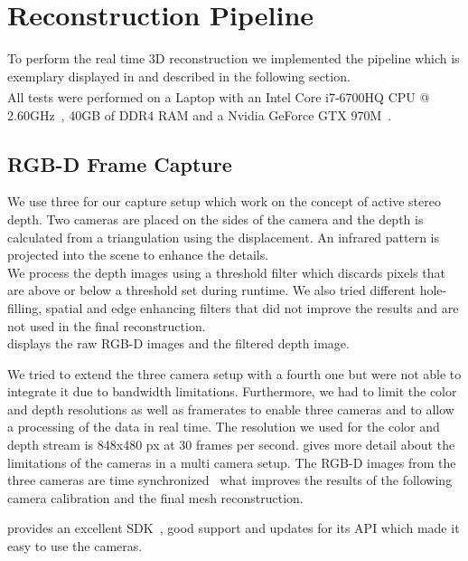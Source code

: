 \documentclass[10pt,twocolumn,letterpaper]{article}
\begin{document}
\section{Reconstruction Pipeline}
To perform the real time 3D reconstruction we implemented the pipeline which is exemplary displayed in  and described in the following section.\\
All tests were performed on a Laptop with an Intel\textsuperscript{\textregistered} Core\texttrademark{} \mbox{i7-6700HQ} CPU @ 2.60GHz~\cite{CPU}, 40GB of DDR4 RAM and a Nvidia GeForce GTX 970M~\cite{GTX970}.

\subsection{RGB-D Frame Capture}
We use three \rscamera{} for our capture setup which work on the concept of active stereo depth. Two cameras are placed on the sides of the camera and the depth is calculated from a triangulation using the displacement. An infrared pattern is projected into the scene to enhance the details.\\
We process the depth images using a threshold filter which discards pixels that are above or below a threshold set during runtime. We also tried different hole-filling, spatial and edge enhancing filters that did not improve the results and are not used in the final reconstruction.\\
 displays the raw RGB-D images and the filtered depth image.

We tried to extend the three camera setup with a fourth one but were not able to integrate it due to bandwidth limitations. Furthermore, we had to limit the color and depth resolutions as well as framerates to enable three cameras and to allow a processing of the data in real time. The resolution we used for the color and depth stream is 848x480 px at 30 frames per second. \cite{RealSenseWhitepaper} gives more detail about the limitations of the cameras in a multi camera setup.
\newpage
The RGB-D images from the three cameras are time synchronized~\cite{RealSenseWhitepaper} what improves the results of the following camera calibration and the final mesh reconstruction.

\intel{} provides an excellent SDK~\cite{RealSenseSDK}, good support and updates for its API which made it easy to use the cameras.
\end{document}
